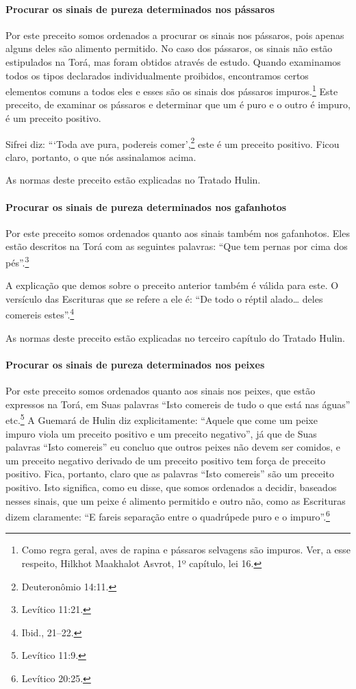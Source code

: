 \begin{multicols}{2}
\paragraph{Procurar os sinais de pureza determinados nos pássaros}

Por este preceito somos ordenados a procurar os sinais nos pássaros,
pois apenas alguns deles são alimento permitido. No caso dos pássaros,
os sinais não estão estipulados na Torá\starr, mas foram obtidos através de
estudo. Quando examinamos todos os tipos declarados individualmente
proibidos, encontramos certos elementos comuns a todos eles e esses são
os sinais dos pássaros impuros.\footnote{Como regra geral, aves de rapina e pássaros selvagens são impuros.
Ver, a esse respeito, Hilkhot Maakhalot Asvrot, 1º capítulo, lei 16.} Este preceito, de examinar os pássaros e
determinar que um é puro e o outro é impuro, é um preceito positivo.

Sifrei\starr{} diz: ```Toda ave pura, podereis comer',\footnote{Deuteronômio 14:11.} este
é um preceito positivo. Ficou claro, portanto, o que nós assinalamos
acima.

As normas deste preceito estão explicadas no Tratado Hulin\starr.

\paragraph{Procurar os sinais de pureza determinados nos gafanhotos}

Por este preceito somos ordenados quanto aos sinais também nos
gafanhotos. Eles estão descritos na Torá\starr{} com as seguintes palavras:
``Que tem pernas por cima dos pés''.\footnote{Levítico 11:21.}

A explicação que demos sobre o preceito anterior também é válida para
este. O versículo das Escrituras que se refere a ele é: ``De todo o
réptil alado\ldots{} deles comereis estes''.\footnote{Ibid., 21--22.}

As normas deste preceito estão explicadas no terceiro capítulo do
Tratado Hulin\starr.

\paragraph{Procurar os sinais de pureza determinados nos peixes}

Por este preceito somos ordenados quanto aos sinais nos peixes, que
estão expressos na Torá\starr, em Suas palavras ``Isto comereis de tudo o que
está nas águas'' etc.\footnote{Levítico 11:9.} A Guemará\starr{} de Hulin\starr{} diz
explicitamente: ``Aquele que come um peixe impuro viola um preceito
positivo e um preceito negativo'', já que de Suas palavras ``Isto
comereis'' eu concluo que outros peixes não devem ser comidos, e um
preceito negativo derivado de um preceito positivo tem força de preceito
positivo. Fica, portanto, claro que as palavras ``Isto comereis'' são
um preceito positivo. Isto significa, como eu disse, que somos
ordenados a decidir, baseados nesses sinais, que um peixe é alimento
permitido e outro não, como as Escrituras dizem claramente: ``E fareis
separação entre o quadrúpede puro e o impuro''.\footnote{Levítico 20:25.}


\end{multicols}
